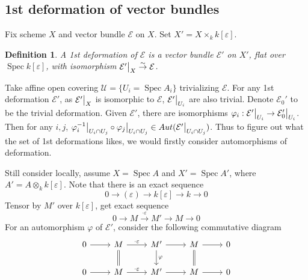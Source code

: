 \documentclass{ctexart}
\newtheorem{definition}{Definition}[section]
\newcommand{\spec}{\operatorname{Spec}}
\begin{document}
\subsection{1st deformation of vector bundles}
\label{subsection:Deformation_Theory_1st_deformation_of_vector_bundles}

Fix scheme $X$ and vector bundle $\mathcal{E}$ on $X$.
Set $X' = X \times_{k} k[\varepsilon]$.
\begin{definition}
    A 1st deformation of $\mathcal{E}$ is a vector bundle $\mathcal{E}'$ on $X'$, 
    flat over $\spec k[\varepsilon]$, with isomorphism $\mathcal{E}'\big{|}_{X} \overset{\sim}{\rightarrow} \mathcal{E}$.
\end{definition}
Take affine open covering $\mathcal{U} = \{U_{i} = \spec A_{i}\}$ trivializing $\mathcal{E}$.
For any 1st deformation $\mathcal{E}'$, as $\mathcal{E}'\big{|}_{X}$ is isomorphic to $\mathcal{E}$, $\mathcal{E}'\big{|}_{U_{i}}$ are also trivial.
Denote $\mathcal{E}_{0}'$ to be the trivial deformation.
Given $\mathcal{E}'$, there are isomorphisms $\varphi_{i}: \mathcal{E}'\big{|}_{U_{i}} \rightarrow \mathcal{E}_{0}'\big{|}_{U_{i}}$.
Then for any $i, j$, $\varphi_{i}^{-1}\big{|}_{U_{i} \cap U_{j}} \circ \varphi_{j}\big{|}_{U_{i} \cap U_{j}}\in Aut(\mathcal{E}'\big{|}_{U_{i} \cap U_{j}})$.
Thus to figure out what the set of 1st deformations likes, we would firstly consider automorphisms of deformation.
\par
Still consider locally, assume $X = \spec A$ and $X' = \spec A'$, where $A' = A \otimes_{k} k[\varepsilon]$.
Note that there is an exact sequence
\begin{equation}
    0 \longrightarrow (\varepsilon) \longrightarrow k[\varepsilon] \longrightarrow k \longrightarrow 0
\end{equation}
Tensor by $M'$ over $k[\varepsilon]$, get exact sequence
\begin{equation}
    0 \longrightarrow M \overset{\cdot \varepsilon}{\longrightarrow} M' \longrightarrow M \longrightarrow 0
\end{equation}
For an automorphism $\varphi$ of $\mathcal{E}'$, consider the following commutative diagram
\begin{equation}
    \begin{tikzcd}
        0 \arrow[r] &
        M \arrow[r, "\cdot \varepsilon"] \arrow[d, equal] &
        M' \arrow[r] \arrow[d, "\varphi"] &
        M \arrow[r] \arrow[d, equal] &
        0 \\
        0 \arrow[r] &
        M \arrow[r, "\cdot \varepsilon"] &
        M' \arrow[r] &
        M \arrow[r] &
        0
    \end{tikzcd}
\end{equation}
\end{document}

